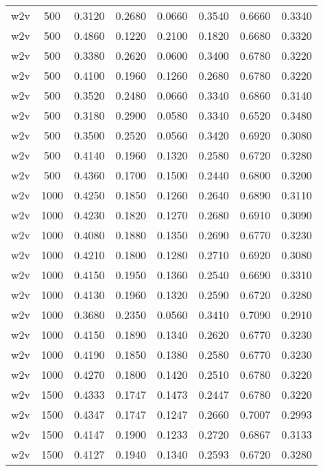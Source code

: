 \begin{scriptsize}
\begin{longtable}{cccccccc}
		w2v      & 500  & 0.3120 & 0.2680 & 0.0660 & 0.3540 & 0.6660 & 0.3340 \\
		w2v      & 500  & 0.4860 & 0.1220 & 0.2100 & 0.1820 & 0.6680 & 0.3320 \\
		w2v      & 500  & 0.3380 & 0.2620 & 0.0600 & 0.3400 & 0.6780 & 0.3220 \\
		w2v      & 500  & 0.4100 & 0.1960 & 0.1260 & 0.2680 & 0.6780 & 0.3220 \\
		w2v      & 500  & 0.3520 & 0.2480 & 0.0660 & 0.3340 & 0.6860 & 0.3140 \\
		w2v      & 500  & 0.3180 & 0.2900 & 0.0580 & 0.3340 & 0.6520 & 0.3480 \\
		w2v      & 500  & 0.3500 & 0.2520 & 0.0560 & 0.3420 & 0.6920 & 0.3080 \\
		w2v      & 500  & 0.4140 & 0.1960 & 0.1320 & 0.2580 & 0.6720 & 0.3280 \\
		w2v      & 500  & 0.4360 & 0.1700 & 0.1500 & 0.2440 & 0.6800 & 0.3200 \\
		w2v      & 1000 & 0.4250 & 0.1850 & 0.1260 & 0.2640 & 0.6890 & 0.3110 \\
		w2v      & 1000 & 0.4230 & 0.1820 & 0.1270 & 0.2680 & 0.6910 & 0.3090 \\
		w2v      & 1000 & 0.4080 & 0.1880 & 0.1350 & 0.2690 & 0.6770 & 0.3230 \\
		w2v      & 1000 & 0.4210 & 0.1800 & 0.1280 & 0.2710 & 0.6920 & 0.3080 \\
		w2v      & 1000 & 0.4150 & 0.1950 & 0.1360 & 0.2540 & 0.6690 & 0.3310 \\
		w2v      & 1000 & 0.4130 & 0.1960 & 0.1320 & 0.2590 & 0.6720 & 0.3280 \\
		w2v      & 1000 & 0.3680 & 0.2350 & 0.0560 & 0.3410 & 0.7090 & 0.2910 \\
		w2v      & 1000 & 0.4150 & 0.1890 & 0.1340 & 0.2620 & 0.6770 & 0.3230 \\
		w2v      & 1000 & 0.4190 & 0.1850 & 0.1380 & 0.2580 & 0.6770 & 0.3230 \\
		w2v      & 1000 & 0.4270 & 0.1800 & 0.1420 & 0.2510 & 0.6780 & 0.3220 \\
		w2v      & 1500 & 0.4333 & 0.1747 & 0.1473 & 0.2447 & 0.6780 & 0.3220 \\
		w2v      & 1500 & 0.4347 & 0.1747 & 0.1247 & 0.2660 & 0.7007 & 0.2993 \\
		w2v      & 1500 & 0.4147 & 0.1900 & 0.1233 & 0.2720 & 0.6867 & 0.3133 \\
		w2v      & 1500 & 0.4127 & 0.1940 & 0.1340 & 0.2593 & 0.6720 & 0.3280 \\

\end{longtable}
\end{scriptsize}
